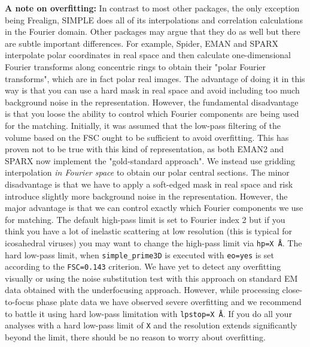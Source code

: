 \documentclass[a4paper,11pt]{article}
\newcommand{\prgname}[1]{\textcolor{NavyBlue}{\texttt{#1}}}
\begin{document}
\textbf{A note on overfitting:} In contrast to most other packages, the only exception being Frealign, SIMPLE does all of its interpolations and correlation calculations in the Fourier domain. Other packages may argue that they do as well but there are subtle important differences. For example, Spider, EMAN and SPARX interpolate polar coordinates in real space and then calculate one-dimensional Fourier transforms along concentric rings to obtain their "polar Fourier transforms", which are in fact polar real images. The advantage of doing it in this way is that you can use a hard mask in real space and avoid including too much background noise in the representation. However, the fundamental disadvantage is that you loose the ability to control which Fourier components are being used for the matching. Initially, it was assumed that the low-pass filtering of the volume based on the FSC ought to be sufficient to avoid overfitting. This has proven not to be true with this kind of representation, as both EMAN2 and SPARX now implement the "gold-standard approach". We instead use gridding interpolation \textit{in Fourier space} to obtain our polar central sections. The minor disadvantage is that we have to apply a soft-edged mask in real space and risk introduce slightly more background noise in the representation. However, the major advantage is that we can control exactly which Fourier components we use for matching. The default high-pass limit is set to Fourier index 2 but if you think you have a lot of inelastic scattering at low resolution (this is typical for icosahedral viruses) you may want to change the high-pass limit via \texttt{hp=X \AA{}}. The hard low-pass limit, when \prgname{simple\_prime3D} is executed with \texttt{eo=yes} is set according to the \texttt{FSC=0.143} criterion. We have yet to detect any overfitting visually or using the noise substitution test \citep{Chen:2013aa} with this approach on standard EM data obtained with the underfocusing approach. However, while processing close-to-focus phase plate data we have observed severe overfitting and we recommend to battle it using hard low-pass limitation with \texttt{lpstop=X \AA{}}. If you do all your analyses with a hard  low-pass limit of \texttt{X} and the resolution extends significantly beyond the limit, there should be no reason to worry about overfitting.
\end{document}
